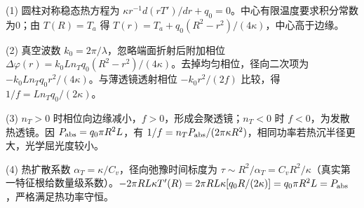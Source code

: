 (1) 圆柱对称稳态热方程为 \(\kappa r^{-1}d(rT')/dr+q_0=0\)。中心有限温度要求积分常数为0；由 \(T(R)=T_a\) 得 \(\boxed{T(r)=T_a+q_0(R^2-r^2)/(4\kappa)}\)，中心高于边缘。

(2) 真空波数 \(k_0=2\pi/\lambda\)，忽略端面折射后附加相位 \(\Delta\varphi(r)=k_0Ln_Tq_0(R^2-r^2)/(4\kappa)\)。去掉均匀相位，径向二次项为 \(-k_0Ln_Tq_0r^2/(4\kappa)\)。与薄透镜透射相位 \(-k_0r^2/(2f)\) 比较，得 \(\boxed{1/f=Ln_Tq_0/(2\kappa)}\)。

(3) \(n_T>0\) 时相位向边缘减小，\(f>0\)，形成会聚透镜；\(n_T<0\) 时 \(f<0\)，为发散热透镜。因 \(P_{\rm abs}=q_0\pi R^2L\)，有 \(1/f=n_TP_{\rm abs}/(2\pi\kappa R^2)\)，相同功率若热沉半径更大，光学屈光度较小。

(4) 热扩散系数 \(\alpha_T=\kappa/C_v\)，径向弛豫时间标度为 \(\tau\sim R^2/\alpha_T=C_vR^2/\kappa\)（真实第一特征根给数量级系数）。\(-2\pi RL\kappa T'(R)=2\pi RL\kappa[q_0R/(2\kappa)]=q_0\pi R^2L=P_{\rm abs}\)，严格满足热功率守恒。
